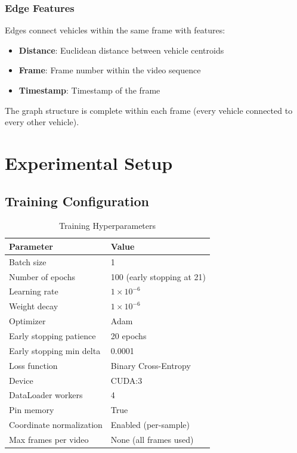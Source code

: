 \documentclass[11pt,a4paper]{article}
\begin{document}
\subsubsection{Edge Features}

Edges connect vehicles within the same frame with features:
\begin{itemize}
    \item \textbf{Distance}: Euclidean distance between vehicle centroids
    \item \textbf{Frame}: Frame number within the video sequence
    \item \textbf{Timestamp}: Timestamp of the frame
\end{itemize}

The graph structure is complete within each frame (every vehicle connected to every other vehicle).

\section{Experimental Setup}

\subsection{Training Configuration}

\begin{table}[H]
\centering
\caption{Training Hyperparameters}
\begin{tabular}{ll}
\toprule
\textbf{Parameter} & \textbf{Value} \\
\midrule
Batch size & 1 \\
Number of epochs & 100 (early stopping at 21) \\
Learning rate & $1 \times 10^{-6}$ \\
Weight decay & $1 \times 10^{-6}$ \\
Optimizer & Adam \\
Early stopping patience & 20 epochs \\
Early stopping min delta & 0.0001 \\
Loss function & Binary Cross-Entropy \\
Device & CUDA:3 \\
DataLoader workers & 4 \\
Pin memory & True \\
Coordinate normalization & Enabled (per-sample) \\
Max frames per video & None (all frames used) \\
\bottomrule
\end{tabular}
\end{table}
\end{document}
